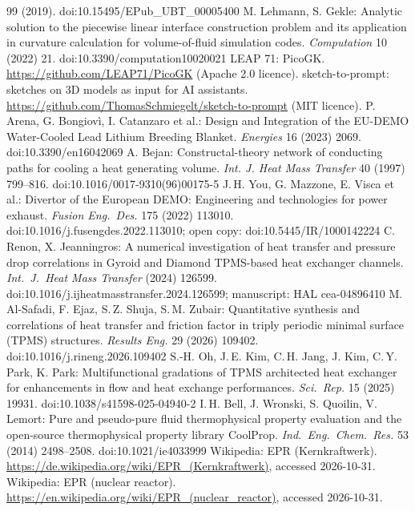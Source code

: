 \documentclass[10pt,a4paper]{article}
\begin{document}
\begin{thebibliography}{99}
  (2019). doi:10.15495/EPub\_UBT\_00005400
 M. Lehmann, S. Gekle: Analytic solution to the piecewise linear interface
  construction problem and its application in curvature calculation for volume-of-fluid simulation codes.
  \emph{Computation} 10 (2022) 21. doi:10.3390/computation10020021
 LEAP 71: PicoGK. \url{https://github.com/LEAP71/PicoGK} (Apache 2.0 licence).
 sketch-to-prompt: sketches on 3D models as input for AI assistants.
  \url{https://github.com/ThomasSchmiegelt/sketch-to-prompt} (MIT licence).
 P. Arena, G. Bongiovì, I. Catanzaro et al.: Design and Integration of the EU-DEMO Water-Cooled Lead
  Lithium Breeding Blanket. \emph{Energies} 16 (2023) 2069. doi:10.3390/en16042069
 A. Bejan: Constructal-theory network of conducting paths for cooling a heat generating volume.
  \emph{Int. J. Heat Mass Transfer} 40 (1997) 799--816. doi:10.1016/0017-9310(96)00175-5
 J.\,H. You, G. Mazzone, E. Visca et al.: Divertor of the European DEMO: Engineering and technologies
  for power exhaust. \emph{Fusion Eng.\ Des.} 175 (2022) 113010. doi:10.1016/j.fusengdes.2022.113010;
  open copy: doi:10.5445/IR/1000142224
 C. Renon, X. Jeanningros: A numerical investigation of heat transfer and pressure drop correlations in
  Gyroid and Diamond TPMS-based heat exchanger channels. \emph{Int.\ J.\ Heat Mass Transfer} (2024) 126599.
  doi:10.1016/j.ijheatmasstransfer.2024.126599; manuscript: HAL cea-04896410
 M. Al-Safadi, F. Ejaz, S.\,Z. Shuja, S.\,M. Zubair: Quantitative synthesis and correlations of heat
  transfer and friction factor in triply periodic minimal surface (TPMS) structures. \emph{Results Eng.} 29 (2026)
  109402. doi:10.1016/j.rineng.2026.109402
 S.-H. Oh, J.\,E. Kim, C.\,H. Jang, J. Kim, C.\,Y. Park, K. Park: Multifunctional gradations of TPMS
  architected heat exchanger for enhancements in flow and heat exchange performances. \emph{Sci.\ Rep.} 15 (2025)
  19931. doi:10.1038/s41598-025-04940-2
 I.\,H. Bell, J. Wronski, S. Quoilin, V. Lemort: Pure and pseudo-pure fluid thermophysical property
  evaluation and the open-source thermophysical property library CoolProp. \emph{Ind.\ Eng.\ Chem.\ Res.} 53 (2014)
  2498--2508. doi:10.1021/ie4033999
 Wikipedia: EPR (Kernkraftwerk). \url{https://de.wikipedia.org/wiki/EPR_(Kernkraftwerk)}, accessed 2026-10-31.
 Wikipedia: EPR (nuclear reactor). \url{https://en.wikipedia.org/wiki/EPR_(nuclear_reactor)}, accessed 2026-10-31.

\end{thebibliography}
\end{document}
